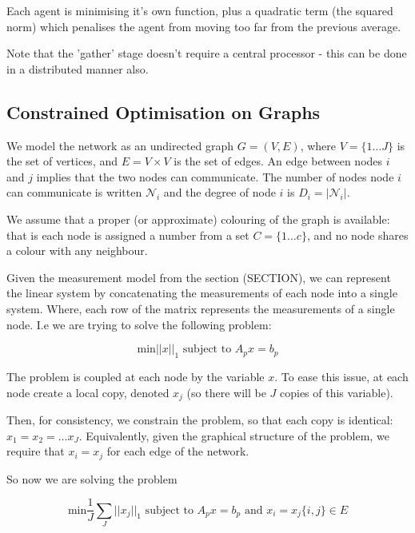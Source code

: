 \documentclass{article}
\begin{document}
Each agent is minimising it's own function, plus a quadratic term (the squared norm) which penalises the agent from moving too far from the previous average.

Note that the 'gather' stage doesn't require a central processor - this can be done in a distributed manner also.



\subsection{Constrained Optimisation on Graphs}
\label{optongraphs}
We model the network as an undirected graph \(G = \left(V,E\right)\), where \(V = \{1 \ldots J\}\) is the set of vertices, and \(E = V \times V\) is the set of edges. An edge between nodes \(i\) and \(j\) implies that the two nodes can communicate. The number of nodes node \(i\) can communicate is written \(\mathcal{N}_i\) and the degree of node \(i\) is \(D_i = |\mathcal{N}_i|\). 

We assume that a proper (or approximate) colouring of the graph is available: that is each node is assigned a number from a set \(C = \{1 \ldots c \} \), and no node shares a colour with any neighbour.

Given the measurement model from the section (SECTION), we can represent the linear system by concatenating the measurements of each node into a single system. Where, each row of the matrix represents the measurements of a single node. I.e we are trying to solve the following problem:

\begin{equation}
\text{min} ||x||_1 \text{ subject to } A_p x = b_p
\end{equation}

The problem is coupled at each node by the variable \(x\). To ease this issue, at each node create a local copy, denoted \(x_j\) (so there will be \(J\) copies of this variable). 

Then, for consistency, we constrain the problem, so that each copy is identical: \(x_1 = x_2 = \ldots x_J\). Equivalently, given the graphical structure of the problem, we require that \(x_i = x_j\) for each edge of the network.

So now we are solving the problem

\begin{equation}
\text{min} \frac{1}{J}\sum_J||x_j||_1 \text{ subject to } A_p x = b_p \text{ and } x_i = x_j \{i,j\} \in E 
 \label{constrainedbp}
\end{equation}
 
\end{document}
